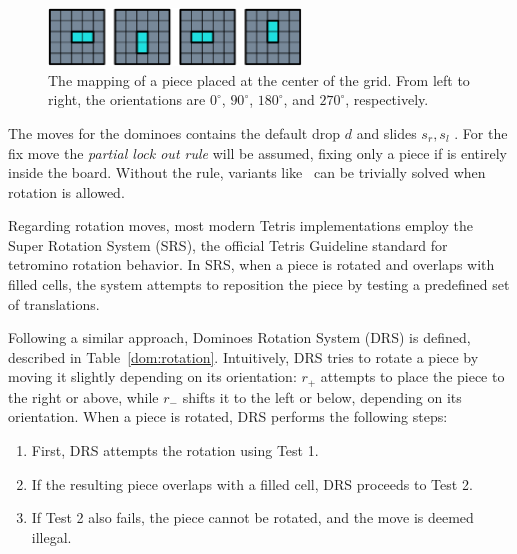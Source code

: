 \begin{figure}[h]
    \centering
    \includegraphics[width=0.6\textwidth]{./pictures/dominoes/mapping.pdf}
    \caption{The mapping of a piece placed at the center of the grid. From left to right, the orientations are \(0^\circ\), \(90^\circ\), \(180^\circ\), and \(270^\circ\), respectively.}
    \label{dom:mapping} 
\end{figure}

The moves for the dominoes contains the default drop $d$ and slides $s_r, s_l$ . For the fix move the \emph{partial lock out rule}\cite{WikiFandom} will be assumed, fixing only a piece if is entirely  inside the board. Without the rule, variants like \survival\ can be trivially solved when rotation is allowed.

Regarding rotation moves, most modern Tetris implementations employ the Super Rotation System (SRS), the official Tetris Guideline standard for tetromino rotation behavior\cite{SRS}. In SRS, when a piece is rotated and overlaps with filled cells, the system attempts to reposition the piece by testing a predefined set of translations. 

\vspace{1em}

Following a similar approach, Dominoes Rotation System (DRS) is defined, described in Table~\ref{dom:rotation}. Intuitively, DRS tries to rotate a piece by moving it slightly depending on its orientation: \(r_+\) attempts to place the piece to the right or above, while \(r_-\) shifts it to the left or below, depending on its orientation. When a piece is rotated, DRS performs the following steps:
\begin{enumerate}
    \item First, DRS attempts the rotation using Test 1. 
    \item If the resulting piece overlaps with a filled cell, DRS proceeds to Test 2. 
    \item If Test 2 also fails, the piece cannot be rotated, and the move is deemed illegal.
\end{enumerate}


